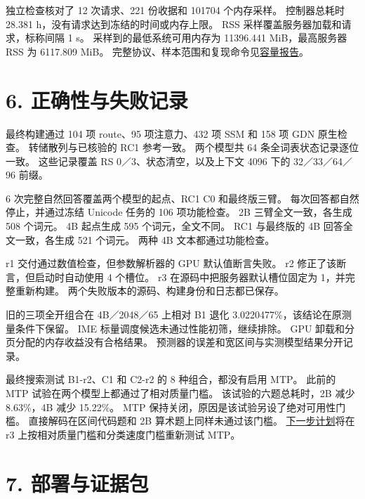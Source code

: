 \documentclass[10pt,a4paper,fontset=none]{ctexart}
\begin{document}
独立检查核对了 12 次请求、221 份收据和 101704 个内存采样。 控制器总耗时
28.381 h，没有请求达到冻结的时间或内存上限。 RSS
采样覆盖服务器加载和请求，标称间隔 1 s。 采样到的最低系统可用内存为
11396.441 MiB，最高服务器 RSS 为 6117.809 MiB。
完整协议、样本范围和复现命令见\href{https://github.com/MoyaMryia/riscv-accl/blob/main/spacemit/reports/2026-10-16-ultralong-final-comparison.md}{容量报告}。

\hypertarget{ux6b63ux786eux6027ux4e0eux5931ux8d25ux8bb0ux5f55}{%
\section{6.
正确性与失败记录}\label{ux6b63ux786eux6027ux4e0eux5931ux8d25ux8bb0ux5f55}}

最终构建通过 104 项 route、95 项注意力、432 项 SSM 和 158 项 GDN
原生检查。 转储散列与已核验的 RC1 参考一致。 两个模型共 64
条全词表状态记录逐位一致。 这些记录覆盖 RS 0／3、状态清空，以及上下文
4096 下的 32／33／64／96 前缀。

6 次完整自然回答覆盖两个模型的起点、RC1 C0 和最终版三臂。
每次回答都自然停止，并通过冻结 Unicode 任务的 106 项功能检查。 2B
三臂全文一致，各生成 508 个词元。 4B 起点生成 595 个词元，全文不同。 RC1
与最终版的 4B 回答全文一致，各生成 521 个词元。 两种 4B
文本都通过功能检查。

r1 交付通过数值检查，但参数解析器的 GPU 默认值断言失败。 r2
修正了该断言，但启动时自动使用 4 个槽位。 r3
在源码中把服务器默认槽位固定为 1，并完整重新构建。
两个失败版本的源码、构建身份和日志都已保存。

旧的三项全开组合在 4B／2048／65 上相对 B1 退化
3.0220477\%，该结论在原测量条件下保留。 IME
标量调度候选未通过性能初筛，继续排除。 GPU
卸载和分页分配的内存收益没有合格结果。
预测器的误差和宽区间与实测模型结果分开记录。

最终搜索测试 B1-r2、C1 和 C2-r2 的 8 种组合，都没有启用 MTP。 此前的 MTP
试验在两个模型上都通过了相对质量门槛。 该试验的六题总耗时，2B 减少
8.63\%，4B 减少 15.22\%。 MTP
保持关闭，原因是该试验另设了绝对可用性门槛。 直接解码在区间代码题和 2B
算术题上同样未通过该门槛。
\href{https://github.com/MoyaMryia/riscv-accl/blob/main/spacemit/reports/2026-10-16-next-plan.md}{下一步计划}将在
r3 上按相对质量门槛和分类速度门槛重新测试 MTP。

\hypertarget{ux90e8ux7f72ux4e0eux8bc1ux636eux5305}{%
\section{7. 部署与证据包}\label{ux90e8ux7f72ux4e0eux8bc1ux636eux5305}}
\end{document}
